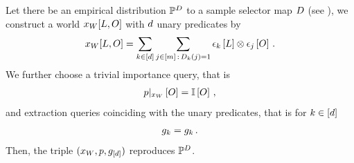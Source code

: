 \begin{theorem}
    \label{the:reproducingSingleObjects}
    Let there be an empirical distribution $\mathbb{P}^{D}$ to a sample selector map $D$ (see ), we construct a world $x_{W}[L,O]$ with $d$ unary predicates by
    \begin{align*}
        x_{W}[{L,O}]
        = \sum_{k\in[d]} \sum_{j\in[m] \,:\, D_{k}(j)=1} \epsilon_{k}\left[L\right] \otimes \epsilon_{j}\left[O\right] \, .
    \end{align*}
    We further choose a trivial importance query, that is
    \begin{align*}
        {p}|_{x_{W}} \left[O\right] = \mathbb{I}\left[O\right] \, ,
    \end{align*}
    and extraction queries coinciding with the unary predicates, that is for $k\in[d]$
    \begin{align*}
        g_{k} = g_{k} \, .
    \end{align*}
    Then, the triple $(x_{W},p,g_{[d]})$ reproduces $\mathbb{P}^{D}$.
\end{theorem}
